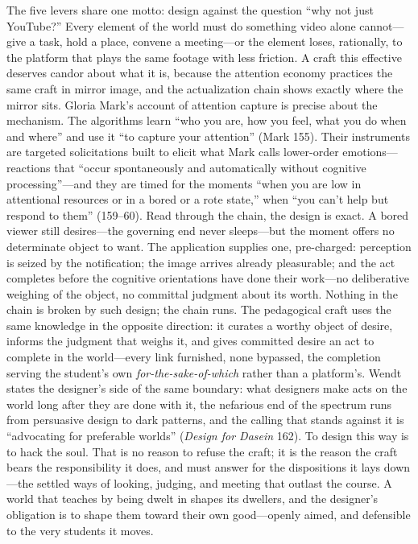 The five levers share one motto: design against the question ``why not
just YouTube?'' Every element of the world must do something video
alone cannot---give a task, hold a place, convene a meeting---or the
element loses, rationally, to the platform that plays the same footage
with less friction. A craft this effective deserves candor about what it
is, because the attention economy practices the same craft in mirror
image, and the actualization chain shows exactly where the mirror
sits. Gloria Mark's account of attention capture is precise about the
mechanism. The algorithms learn ``who you are, how you feel, what you
do when and where'' and use it ``to capture your attention'' (Mark
155). Their instruments are targeted solicitations built to elicit
what Mark calls lower-order emotions---reactions that ``occur
spontaneously and automatically without cognitive processing''---and
they are timed for the moments ``when you are low in attentional
resources or in a bored or a rote state,'' when ``you can't help but
respond to them'' (159--60). Read through the chain, the design is
exact. A bored viewer still desires---the governing end never
sleeps---but the moment offers no determinate object to want. The
application supplies one, pre-charged: perception is seized by the
notification; the image arrives already pleasurable; and the act
completes before the cognitive orientations have done their
work---no deliberative weighing of the object, no committal judgment
about its worth. Nothing in the chain is broken by such design; the
chain runs. The pedagogical craft uses the same knowledge in the
opposite direction: it curates a worthy object of desire, informs the
judgment that weighs it, and gives committed desire an act to complete
in the world---every link furnished, none bypassed, the completion
serving the student's own \textit{for-the-sake-of-which} rather than a
platform's. Wendt states the designer's side of the same boundary:
what designers make acts on the world long after they are done with
it, the nefarious end of the spectrum runs from persuasive design to
dark patterns, and the calling that stands against it is
``advocating for preferable worlds'' (\textit{Design for Dasein} 162).
To design this way is to hack the soul. That is no reason to refuse
the craft; it is the reason the craft bears the responsibility it
does, and must answer for the dispositions it lays down---the settled
ways of looking, judging, and meeting that outlast the course. A world
that teaches by being dwelt in shapes its dwellers, and the designer's
obligation is to shape them toward their own good---openly aimed, and
defensible to the very students it moves.
